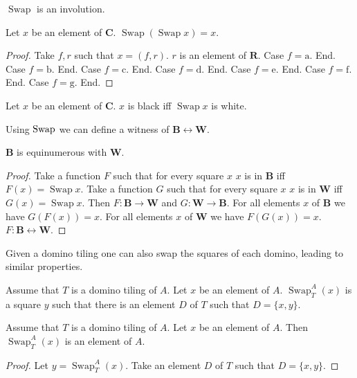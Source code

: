 \documentclass{article}
\newcommand{\Rank}{\mathbf{R}} %
\newcommand{\fileA}{\mathrm{a}}
\newcommand{\fileB}{\mathrm{b}}
\newcommand{\fileC}{\mathrm{c}}
\newcommand{\fileD}{\mathrm{d}}
\newcommand{\fileE}{\mathrm{e}}
\newcommand{\fileF}{\mathrm{f}}
\newcommand{\fileG}{\mathrm{g}}
\newcommand{\Checkerboard}{\mathbf{C}}
\newcommand{\Black}{\mathbf{B}}
\newcommand{\White}{\mathbf{W}}
\newcommand{\Swap}[1]{\operatorname{Swap}#1}
\newcommand{\Sw}[3]{\operatorname{Swap}_{#1}^{#2}(#3)}
\begin{document}
$\Swap{}$ is an involution.

\begin{forthel}
    \begin{lemma}
        Let $x$ be an element of $\Checkerboard$.
        $\Swap{(\Swap{x})} = x$.
    \end{lemma}
    \begin{proof}
        Take $f, r$ such that $x = (f,r)$. $r$ is an element of $\Rank$.
        Case $f = \fileA$. End.
        Case $f = \fileB$. End.
        Case $f = \fileC$. End.
        Case $f = \fileD$. End.
        Case $f = \fileE$. End.
        Case $f = \fileF$. End.
        Case $f = \fileG$. End.
    \end{proof}

    \begin{lemma}
        Let $x$ be an element of $\Checkerboard$.
        $x$ is black iff $\Swap{x}$ is white.
    \end{lemma}
\end{forthel}

Using $\Swap$ we can define a witness of $\Black \leftrightarrow \White$.

\begin{forthel}
    \begin{lemma}
        $\Black$ is equinumerous with $\White$.
    \end{lemma}
    \begin{proof}
        Take a function $F$ such that for every square $x$ $x$ is in $\Black$ iff $F(x) = \Swap{x}$.
        Take a function $G$ such that for every square $x$ $x$ is in $\White$ iff $G(x) = \Swap{x}$.
        Then $F : \Black \to \White$ and $G : \White \to \Black$.
        For all elements $x$ of $\Black$ we have $G(F(x)) = x$.
        For all elements $x$ of $\White$ we have $F(G(x)) = x$.
        $F : \Black \leftrightarrow \White$.
    \end{proof}
\end{forthel}

Given a domino tiling one can also swap the squares of each domino,
leading to similar properties.

\begin{forthel}
    \begin{signature}
        Assume that $T$ is a domino tiling of $A$.
        Let $x$ be an element of $A$.
        $\Sw{T}{A}{x}$ is a square $y$ such that there is an element $D$ of $T$
        such that $D = \{x,y\}$.
    \end{signature}

    \begin{lemma}
        Assume that $T$ is a domino tiling of $A$.
        Let $x$ be an element of $A$.
        Then $\Sw{T}{A}{x}$ is an element of $A$.
    \end{lemma}
    \begin{proof}
        Let $y = \Sw{T}{A}{x}$.
        Take an element $D$ of $T$ such that $D = \{x,y\}$.
    \end{proof}
\end{forthel}
\end{document}

